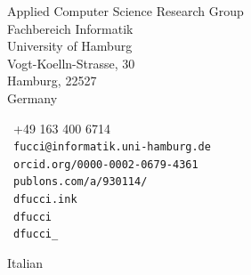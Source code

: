 \documentclass[9pt]{article}
\makeatletter
\def\myemail{fucci@informatik.uni-hamburg.de}
\def\myphone{+49 163 400 6714}
\def\mypublons{publons.com/a/930114/}
\def\myorcid{orcid.org/0000-0002-0679-4361}
\makeatother
\begin{document}
\begin{minipage}[t]{2.95in}
{\footnotesize Applied Computer Science Research Group\vspace{-0.04in}\\
\noindent Fachbereich Informatik \vspace{-0.04in}\\
\noindent University of Hamburg \vspace{-0.01in}\\
\noindent Vogt-Koelln-Strasse, 30 \vspace{-0.04in}\\
\noindent Hamburg, 22527 \vspace{-0.04in}\\
\noindent Germany
}
\end{minipage}
\begin{minipage}[t]{1.7in}
  {\footnotesize \faPhone~\myphone \\ 
  \noindent \faEnvelope~\texttt{\myemail}\vspace{-0.03in}\\
  \noindent \aiOrcid~\texttt{\myorcid} \vspace{-0.03in}\\
  \noindent \aiPublonsSquare~\texttt{\mypublons} \vspace{-0.03in}\\
   \noindent \faSitemap~\texttt{dfucci.ink} \vspace{-0.03in}\\
  \noindent \faGithub~\texttt{dfucci} \vspace{-0.03in}\\
 \noindent  \faTwitter~\texttt{dfucci\_}
 }
\end{minipage}


\bigskip
\bigskip
\bigskip

\reversemarginpar

\medskip
\bigskip


 \noindent Italian

 \medskip
\end{document}
